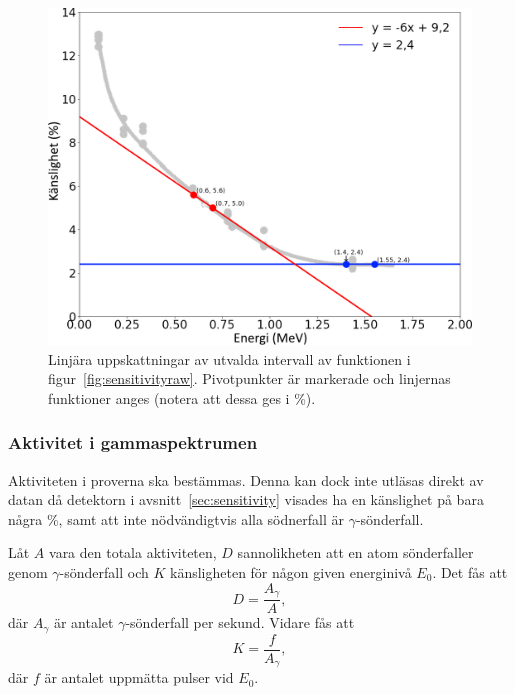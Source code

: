 \begin{figure}[!ht]
    \centering
    \includegraphics[width=\textwidth, keepaspectratio]{../images/sensitivity.png}
    \caption{
        Linjära uppskattningar av utvalda intervall av funktionen i
        figur~\ref{fig:sensitivityraw}. Pivotpunkter är markerade och linjernas
        funktioner anges (notera att dessa ges i \unit{\percent}).
    }
    \label{fig:sensitivity}
\end{figure}

\subsubsection{Aktivitet i gammaspektrumen}

Aktiviteten i proverna ska bestämmas. Denna kan dock inte utläsas direkt av
datan då detektorn i avsnitt~\ref{sec:sensitivity} visades ha en känslighet
på bara några \unit{\percent}, samt att inte nödvändigtvis alla södnerfall är
$\gamma$-sönderfall.

Låt $A$ vara den totala aktiviteten, $D$ sannolikheten att en atom
sönderfaller genom $\gamma$-sönderfall och $K$ känsligheten för någon given
energinivå $E_0$. Det fås att
%
\begin{equation}
    D = \frac{A_\gamma}{A} \label{eq:sharegamma},
\end{equation}
%
där $A_\gamma$ är antalet $\gamma$-sönderfall per sekund. Vidare fås att
%
\begin{equation}
    K = \frac{f}{A_\gamma} \label{eq:sensitivity},
\end{equation}
%
där $f$ är antalet uppmätta pulser vid $E_0$.


